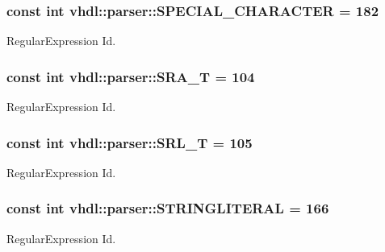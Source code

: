 \subsubsection[{S\+P\+E\+C\+I\+A\+L\+\_\+\+C\+H\+A\+R\+A\+C\+T\+E\+R}]{\setlength{\rightskip}{0pt plus 5cm}const int vhdl\+::parser\+::\+S\+P\+E\+C\+I\+A\+L\+\_\+\+C\+H\+A\+R\+A\+C\+T\+E\+R = 182}\label{namespacevhdl_1_1parser_a00b41dcd266524abde504c21f2fefb25}
Regular\+Expression Id. \hypertarget{namespacevhdl_1_1parser_a47439919c76c9c4bcbd7f1bf57740962}{}
\subsubsection[{S\+R\+A\+\_\+\+T}]{\setlength{\rightskip}{0pt plus 5cm}const int vhdl\+::parser\+::\+S\+R\+A\+\_\+\+T = 104}\label{namespacevhdl_1_1parser_a47439919c76c9c4bcbd7f1bf57740962}
Regular\+Expression Id. \hypertarget{namespacevhdl_1_1parser_a0d9f98ee806ca5f92ca13a68d1e3e14b}{}
\subsubsection[{S\+R\+L\+\_\+\+T}]{\setlength{\rightskip}{0pt plus 5cm}const int vhdl\+::parser\+::\+S\+R\+L\+\_\+\+T = 105}\label{namespacevhdl_1_1parser_a0d9f98ee806ca5f92ca13a68d1e3e14b}
Regular\+Expression Id. \hypertarget{namespacevhdl_1_1parser_a1db2ee717ac6eb49a91830188462b703}{}
\subsubsection[{S\+T\+R\+I\+N\+G\+L\+I\+T\+E\+R\+A\+L}]{\setlength{\rightskip}{0pt plus 5cm}const int vhdl\+::parser\+::\+S\+T\+R\+I\+N\+G\+L\+I\+T\+E\+R\+A\+L = 166}\label{namespacevhdl_1_1parser_a1db2ee717ac6eb49a91830188462b703}
Regular\+Expression Id. \hypertarget{namespacevhdl_1_1parser_a4d58cacc17a1309004d6b20aa0058e0c}{}
